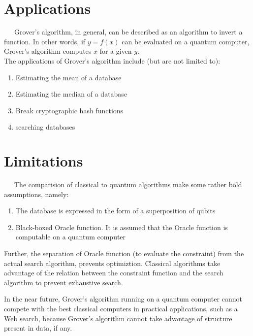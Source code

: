\documentclass[a4paper]{article}
\begin{document}
\pagebreak


\section{ Applications }
~~~Grover's algorithm, in general, can be described as an algorithm to invert a function.
In other words, if $y = f(x)$ can be evaluated on a quantum computer, Grover's algorithm
computes $x$ for a given $y$.
\\
The applications of Grover's algorithm include (but are not limited to):
\begin{enumerate}
        \item Estimating the mean of a database
        \item Estimating the median of a database 
        \item Break cryptographic hash functions 
        \item searching databases
\end{enumerate}

\section { Limitations }
~~~The comparision of classical to quantum algorithms make some rather bold assumptions,
namely:

\begin{enumerate}
        \item The database is expressed in the form of a superposition of qubits
        \item Black-boxed Oracle function. It is assumed that the Oracle function
            is computable on a quantum computer
\end{enumerate}
\par
Further, the separation of Oracle function (to evaluate the constraint) from the actual
search algorithm, prevents optimiztion. Classical algorithms take advantage of the relation
between the constraint function and the search algorithm to prevent exhaustive search.
\par

In the near future, Grover's algorithm running on a quantum computer cannot compete
with the best classical computers in practical applications, such as a Web search, because
Grover's algorithm cannot take advantage of structure present in data, if any.

\pagebreak


\end{document}
